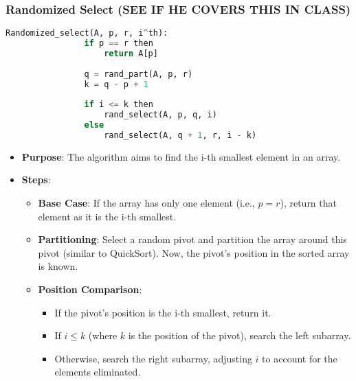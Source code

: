     \subsubsection{Randomized Select (SEE IF HE COVERS THIS IN CLASS)}
    \begin{definition}
        \begin{lstlisting}[language=Python, caption={Randomized Select Algorithm}]
            Randomized_select(A, p, r, i^th):
                if p == r then
                    return A[p]
                
                q = rand_part(A, p, r)
                k = q - p + 1
                
                if i <= k then
                    rand_select(A, p, q, i)
                else
                    rand_select(A, q + 1, r, i - k)
            \end{lstlisting}

        \begin{itemize}
            \item \textbf{Purpose}: The algorithm aims to find the i-th smallest element in an array.
            
            \item \textbf{Steps}:
            \begin{itemize}
                \item \textbf{Base Case}: If the array has only one element (i.e., \( p = r \)), return that element as it is the i-th smallest.
                \item \textbf{Partitioning}: Select a random pivot and partition the array around this pivot (similar to QuickSort). Now, the pivot's position in the sorted array is known.
                \item \textbf{Position Comparison}:
                \begin{itemize}
                    \item If the pivot's position is the i-th smallest, return it.
                    \item If \( i \leq k \) (where \( k \) is the position of the pivot), search the left subarray.
                    \item Otherwise, search the right subarray, adjusting \( i \) to account for the elements eliminated.
                \end{itemize}
            \end{itemize}
        \end{itemize}
        \vspace{1em}


\end{definition}
